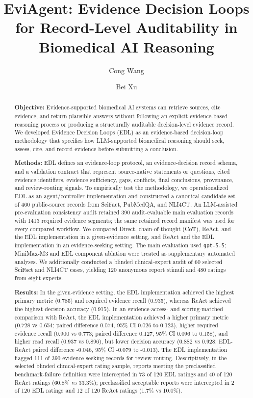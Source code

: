 \documentclass[11pt,a4paper]{article}
\title{EviAgent: Evidence Decision Loops for Record-Level Auditability in Biomedical AI Reasoning}
\author[1]{Cong Wang}
\author[2]{Bei Xu}
\affil[1]{Department of Cardiology, Zhongshan Hospital, Fudan University, Shanghai, China}
\affil[2]{Panvascular and Cardiac Rehabilitation Innovation Laboratory, Shanghai, China}
\date{}
\begin{document}
\maketitle

\begin{abstract}
\textbf{Objective:} Evidence-supported biomedical AI systems can retrieve sources, cite evidence, and return plausible answers without following an explicit evidence-based reasoning process or producing a structurally auditable decision-level evidence record. We developed Evidence Decision Loops (EDL) as an evidence-based decision-loop methodology that specifies how LLM-supported biomedical reasoning should seek, assess, cite, and record evidence before submitting a conclusion.

\textbf{Methods:} EDL defines an evidence-loop protocol, an evidence-decision record schema, and a validation contract that represent source-native statements or questions, cited evidence identifiers, evidence sufficiency, gaps, conflicts, final conclusions, provenance, and review-routing signals. To empirically test the methodology, we operationalized EDL as an agent/controller implementation and constructed a canonical candidate set of 460 public-source records from SciFact, PubMedQA, and NLI4CT. An LLM-assisted pre-evaluation consistency audit retained 390 audit-evaluable main evaluation records with 1413 required evidence segments; the same retained record manifest was used for every compared workflow. We compared Direct, chain-of-thought (CoT), ReAct, and the EDL implementation in a given-evidence setting, and ReAct and the EDL implementation in an evidence-seeking setting. The main evaluation used \texttt{gpt-5.5}; MiniMax-M3 and EDL component ablation were treated as supplementary automated analyses. We additionally conducted a blinded clinical-expert audit of 60 selected SciFact and NLI4CT cases, yielding 120 anonymous report stimuli and 480 ratings from eight experts.

\textbf{Results:} In the given-evidence setting, the EDL implementation achieved the highest primary metric (0.785) and required evidence recall (0.935), whereas ReAct achieved the highest decision accuracy (0.915). In an evidence-access- and scoring-matched comparison with ReAct, the EDL implementation achieved a higher primary metric (0.728 vs 0.654; paired difference 0.074, 95\% CI 0.026 to 0.123), higher required evidence recall (0.900 vs 0.773; paired difference 0.127, 95\% CI 0.096 to 0.158), and higher read recall (0.937 vs 0.896), but lower decision accuracy (0.882 vs 0.928; EDL-ReAct paired difference -0.046, 95\% CI -0.079 to -0.013). The EDL implementation flagged 111 of 390 evidence-seeking records for review routing. Descriptively, in the selected blinded clinical-expert rating sample, reports meeting the preclassified benchmark-failure definition were intercepted in 73 of 120 EDL ratings and 40 of 120 ReAct ratings (60.8\% vs 33.3\%); preclassified acceptable reports were intercepted in 2 of 120 EDL ratings and 12 of 120 ReAct ratings (1.7\% vs 10.0\%).


\end{abstract}
\end{document}
